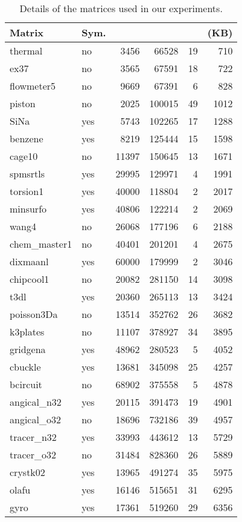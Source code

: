 \documentclass[11pt]{article}
\begin{document}
\begin{table}[!t]
\caption{Details of the matrices used in our experiments.}
\label{tab:matrices-details}
\centering
{\scriptsize
\begin{tabularx}{0.485\textwidth}{@{}ll@{\ \ }rrrr@{}}
\toprule
Matrix & Sym. &  &  &  &  (KB)\\
\midrule
thermal & no & 3456 & 66528 & 19 & 710 \\
ex37 & no & 3565 & 67591 & 18 & 722 \\
flowmeter5 & no & 9669 & 67391 & 6 & 828 \\
piston & no & 2025 & 100015 & 49 & 1012 \\
SiNa & yes & 5743 & 102265 & 17 & 1288 \\
benzene & yes & 8219 & 125444 & 15 & 1598 \\
cage10 & no & 11397 & 150645 & 13 & 1671 \\
spmsrtls & yes & 29995 & 129971 & 4 & 1991 \\
torsion1 & yes & 40000 & 118804 & 2 & 2017 \\
minsurfo & yes & 40806 & 122214 & 2 & 2069 \\
wang4 & no & 26068 & 177196 & 6 & 2188 \\
chem\_master1 & no & 40401 & 201201 & 4 & 2675 \\
dixmaanl & yes & 60000 & 179999 & 2 & 3046 \\
chipcool1 & no & 20082 & 281150 & 14 & 3098 \\
t3dl & yes & 20360 & 265113 & 13 & 3424 \\
poisson3Da & no & 13514 & 352762 & 26 & 3682 \\
k3plates & no & 11107 & 378927 & 34 & 3895 \\
gridgena & yes & 48962 & 280523 & 5 & 4052 \\
cbuckle & yes & 13681 & 345098 & 25 & 4257 \\
bcircuit & no & 68902 & 375558 & 5 & 4878 \\
angical\_n32 & yes & 20115 & 391473 & 19 & 4901 \\
angical\_o32 & no & 18696 & 732186 & 39 & 4957 \\
tracer\_n32 & yes & 33993 & 443612 & 13 & 5729 \\
tracer\_o32 & no & 31484 & 828360 & 26 & 5889 \\
crystk02 & yes & 13965 & 491274 & 35 & 5975 \\
olafu & yes & 16146 & 515651 & 31 & 6295 \\
gyro & yes & 17361 & 519260 & 29 & 6356 \\

\end{tabularx}}
\end{table}
\end{document}
